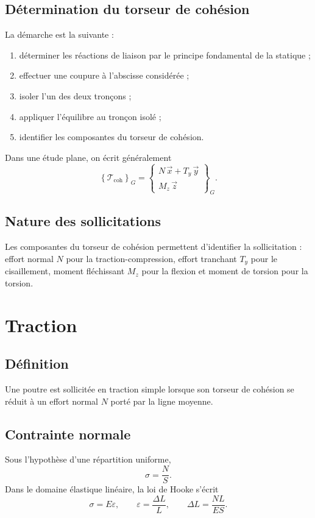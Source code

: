 \subsection{Détermination du torseur de cohésion}
La démarche est la suivante :
\begin{enumerate}
\item déterminer les réactions de liaison par le principe fondamental de la statique ;
\item effectuer une coupure à l'abscisse considérée ;
\item isoler l'un des deux tronçons ;
\item appliquer l'équilibre au tronçon isolé ;
\item identifier les composantes du torseur de cohésion.
\end{enumerate}

Dans une étude plane, on écrit généralement
\[
\left\{\mathcal T_{\mathrm{coh}}\right\}_G=
\left\{\begin{array}{c}
N\,\vec x+T_y\,\vec y\\
M_z\,\vec z
\end{array}\right\}_G.
\]

\subsection{Nature des sollicitations}
Les composantes du torseur de cohésion permettent d'identifier la sollicitation : effort normal $N$ pour la traction-compression, effort tranchant $T_y$ pour le cisaillement, moment fléchissant $M_z$ pour la flexion et moment de torsion pour la torsion.

\section{Traction}
\subsection{Définition}
Une poutre est sollicitée en traction simple lorsque son torseur de cohésion se réduit à un effort normal $N$ porté par la ligne moyenne.
\TLDiagrammeTraction

\subsection{Contrainte normale}
Sous l'hypothèse d'une répartition uniforme,
\[
\sigma=\frac{N}{S}.
\]
Dans le domaine élastique linéaire, la loi de Hooke s'écrit
\[
\sigma=E\varepsilon,
\qquad
\varepsilon=\frac{\Delta L}{L},
\qquad
\Delta L=\frac{NL}{ES}.
\]

